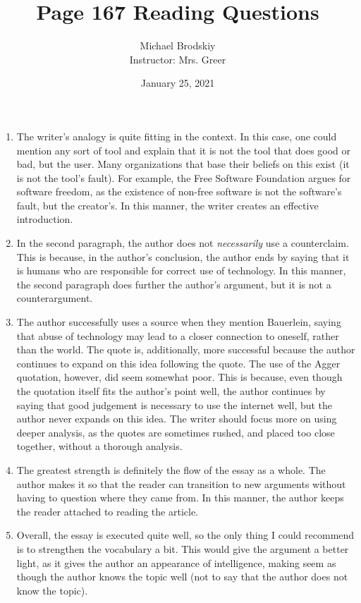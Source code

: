 \documentclass[12pt]{article}
\title{Page 167 Reading Questions}
\date{January 25, 2021}
\author{Michael Brodskiy\\ \small Instructor: Mrs. Greer}
\begin{document}
    \maketitle

    \begin{enumerate}

      \item The writer's analogy is quite fitting in the context. In this case, one could mention any sort of tool and explain that it is not the tool that does good or bad, but the user. Many organizations that base their beliefs on this exist (it is not the tool's fault). For example, the Free Software Foundation argues for software freedom, as the existence of non-free software is not the software's fault, but the creator's. In this manner, the writer creates an effective introduction.
        
      \item In the second paragraph, the author does not \textit{necessarily} use a counterclaim. This is because, in the author's conclusion, the author ends by saying that it is humans who are responsible for correct use of technology. In this manner, the second paragraph does further the author's argument, but it is not a counterargument.

      \item The author successfully uses a source when they mention Bauerlein, saying that abuse of technology may lead to a closer connection to oneself, rather than the world. The quote is, additionally, more successful because the author continues to expand on this idea following the quote. The use of the Agger quotation, however, did seem somewhat poor. This is because, even though the quotation itself fits the author's point well, the author continues by saying that good judgement is necessary to use the internet well, but the author never expands on this idea. The writer should focus more on using deeper analysis, as the quotes are sometimes rushed, and placed too close together, without a thorough analysis. 

      \item The greatest strength is definitely the flow of the essay as a whole. The author makes it so that the reader can transition to new arguments without having to question where they came from. In this manner, the author keeps the reader attached to reading the article. 

      \item Overall, the essay is executed quite well, so the only thing I could recommend is to strengthen the vocabulary a bit. This would give the argument a better light, as it gives the author an appearance of intelligence, making seem as though the author knows the topic well (not to say that the author does not know the topic).


\end{enumerate}
\end{document}
